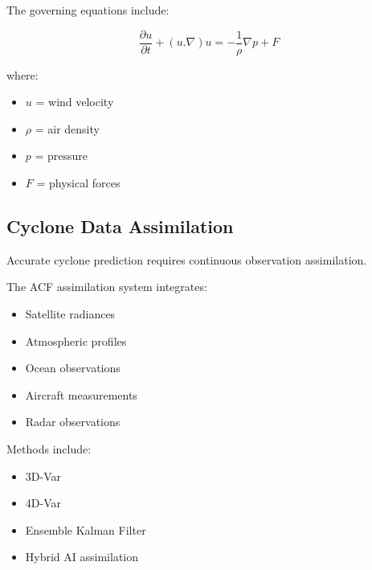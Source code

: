 The governing equations include:

\[
\frac{\partial u}{\partial t}
+
(u.\nabla)u
=
-\frac{1}{\rho}\nabla p
+
F
\]


where:

\begin{itemize}

\item $u$ = wind velocity

\item $\rho$ = air density

\item $p$ = pressure

\item $F$ = physical forces

\end{itemize}



\subsection{Cyclone Data Assimilation}

Accurate cyclone prediction requires continuous observation
assimilation.

The ACF assimilation system integrates:

\begin{itemize}

\item Satellite radiances

\item Atmospheric profiles

\item Ocean observations

\item Aircraft measurements

\item Radar observations

\end{itemize}


Methods include:

\begin{itemize}

\item 3D-Var

\item 4D-Var

\item Ensemble Kalman Filter

\item Hybrid AI assimilation

\end{itemize}


